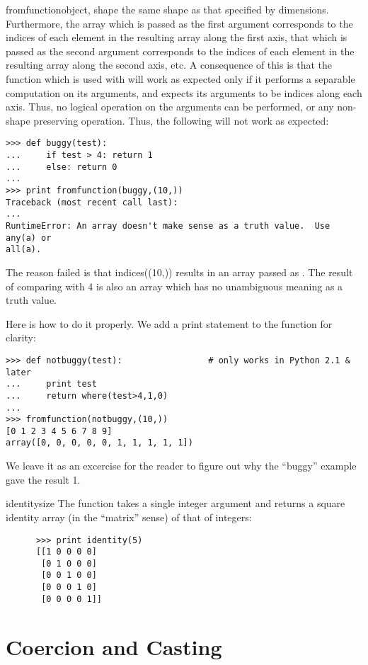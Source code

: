 \begin{funcdesc}{fromfunction}{object, shape}
   the same shape as that specified by dimensions.  Furthermore, the array
   which is passed as the first argument corresponds to the indices of each
   element in the resulting array along the first axis, that which is passed as
   the second argument corresponds to the indices of each element in the
   resulting array along the second axis, etc. A consequence of this is that
   the function which is used with  will work as
   expected only if it performs a separable computation on its arguments, and
   expects its arguments to be indices along each axis. Thus, no logical
   operation on the arguments can be performed, or any non-shape preserving
   operation. Thus, the following will not work as expected:
\begin{verbatim}
>>> def buggy(test):
...     if test > 4: return 1
...     else: return 0
...
>>> print fromfunction(buggy,(10,))
Traceback (most recent call last):
...
RuntimeError: An array doesn't make sense as a truth value.  Use any(a) or
all(a).
\end{verbatim}
The reason  failed is that indices((10,)) results in an array
passed as .  The result of comparing  with 4 is also an
array which has no unambiguous meaning as a truth value.

Here is how to do it properly. We add a print statement to the
   function for clarity:
\begin{verbatim}
>>> def notbuggy(test):                 # only works in Python 2.1 & later
...     print test
...     return where(test>4,1,0)
...
>>> fromfunction(notbuggy,(10,))
[0 1 2 3 4 5 6 7 8 9]
array([0, 0, 0, 0, 0, 1, 1, 1, 1, 1])
\end{verbatim}
   We leave it as an excercise for the reader to figure out why the ``buggy''
   example gave the result 1.
\end{funcdesc}


\begin{funcdesc}{identity}{size}
   The  function takes a single integer argument and returns
   a square identity array (in the ``matrix'' sense) of that  of
   integers:
\begin{verbatim}
      >>> print identity(5)
      [[1 0 0 0 0]
       [0 1 0 0 0]
       [0 0 1 0 0]
       [0 0 0 1 0]
       [0 0 0 0 1]]
\end{verbatim}
\end{funcdesc}



\newpage
\section{Coercion and Casting}
\label{sec:coercion-casting}

